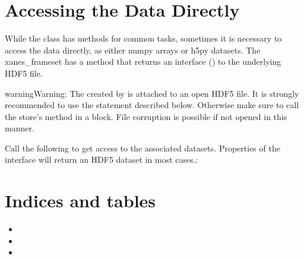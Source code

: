 \documentclass[letterpaper,10pt,english]{sphinxmanual}
\begin{document}
\chapter{Accessing the Data Directly}
\label{\detokenize{data_stores:accessing-the-data-directly}}\label{\detokenize{data_stores::doc}}
While the  class has methods for common tasks,
sometimes it is necessary to access the data directly, as either numpy
arrays or h5py datasets. The xanes\_frameset has a  method
that returns an interface () to the underlying HDF5 file.

\begin{sphinxadmonition}{warning}{Warning:}
The  created by  is
attached to an open HDF5 file. It is strongly recommended to use
the  statement described below. Otherwise make sure to call
the store's  method in a 
block. File corruption is possible if not opened in this manner.
\end{sphinxadmonition}

Call the following to get access to the associated datasets. Properties of the interface will
return an HDF5 dataset in most cases.:

\begin{sphinxVerbatim}[commandchars=\\\{\}]
   
  

   
          
        
\end{sphinxVerbatim}


\chapter{Indices and tables}
\label{\detokenize{index:indices-and-tables}}\begin{itemize}
\item {} 

\item {} 

\item {} 

\end{itemize}



\renewcommand{\indexname}{Index}
\printindex
\end{document}
